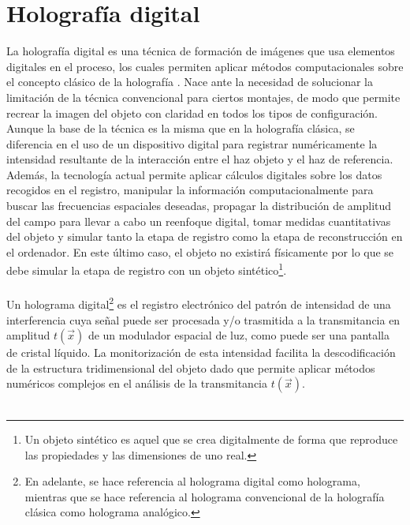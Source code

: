 \documentclass[12pt]{article}
\begin{document}
\section{Holografía digital}
La holografía digital es una técnica  de formación de imágenes que usa elementos digitales en el proceso, los cuales permiten aplicar métodos  computacionales sobre el concepto clásico de la holografía \cite{9}. Nace ante la necesidad de solucionar la limitación de la técnica convencional para ciertos montajes, de modo que permite recrear la imagen del objeto con claridad en todos los tipos de configuración.  Aunque la base de la técnica es la misma que en la holografía clásica, se diferencia en el uso de un dispositivo digital  para registrar numéricamente la intensidad resultante de la interacción entre el haz objeto y el haz de referencia.  Además, la tecnología actual permite aplicar cálculos digitales sobre los datos recogidos en el registro, manipular la información computacionalmente para buscar las frecuencias espaciales deseadas, propagar la distribución de amplitud del campo para llevar a cabo un reenfoque digital, tomar medidas cuantitativas del objeto y  simular tanto la etapa de registro como la etapa de reconstrucción  en el ordenador. En este último caso, el objeto no existirá físicamente por lo que se debe simular la etapa de registro con un objeto sintético\footnote{Un objeto sintético es  aquel  que se crea digitalmente de forma que reproduce las propiedades y las dimensiones de uno real.}. \\ \\  
Un holograma digital\footnote{En adelante, se hace referencia  al holograma digital como holograma, mientras que se hace referencia al holograma convencional de la holografía clásica como holograma analógico.} es el registro electrónico del patrón de intensidad de una interferencia cuya señal  puede ser procesada y/o trasmitida   a la transmitancia en amplitud $t (\Vec{x})$ de un modulador espacial de luz, como puede ser una pantalla de cristal líquido. La monitorización de esta intensidad facilita la descodificación de la estructura tridimensional del objeto dado que permite aplicar métodos numéricos complejos en el análisis de la transmitancia $t (\Vec{x})$. \\ \\ 
\end{document}
